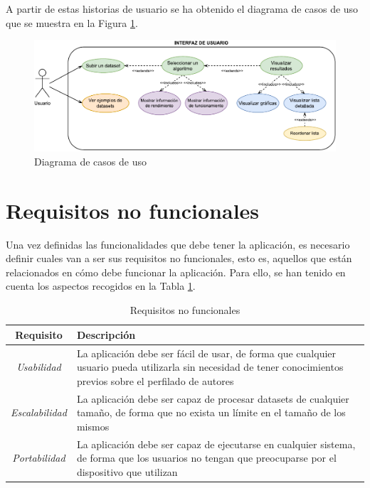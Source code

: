 A partir de estas historias de usuario se ha obtenido el diagrama de casos de uso que se muestra en la Figura
\ref{fig:casos_uso}.

\bigskip
\begin{figure}[H]
	\centering
	\includegraphics[width=\textwidth]{diagramas/usecases.pdf}
	\caption{Diagrama de casos de uso}
	\label{fig:casos_uso}
\end{figure}

\section{Requisitos no funcionales}
\label{sec:analisis_requisitos_no_funcionales}

Una vez definidas las funcionalidades que debe tener la aplicación, es necesario definir cuales van a ser sus requisitos
no funcionales, esto es, aquellos que están relacionados en cómo debe funcionar la aplicación. Para ello, se han tenido
en cuenta los aspectos recogidos en la Tabla \ref{tab:requisitos_no_funcionales}.

\bigskip
\begin{table}[hp!]
  \centering
  \begin{tabular}{c|p{9.6cm}}
		\rowcolor{udcpink!25}
		\small \textbf{Requisito} & \small \textbf{Descripción} \\\hline
		\small \textit{Usabilidad} & \small La aplicación debe ser fácil de usar, de forma que cualquier usuario pueda utilizarla sin
		necesidad de tener conocimientos previos sobre el perfilado de autores \\
		\small \textit{Escalabilidad} & \small La aplicación debe ser capaz de procesar datasets de cualquier tamaño, de forma que no
		exista un límite en el tamaño de los mismos \\
		\small \textit{Portabilidad} & \small La aplicación debe ser capaz de ejecutarse en cualquier sistema, de forma que
		los usuarios no tengan que preocuparse por el dispositivo que utilizan \\
  \end{tabular}
  \caption{Requisitos no funcionales}
  \label{tab:requisitos_no_funcionales}
\end{table}
